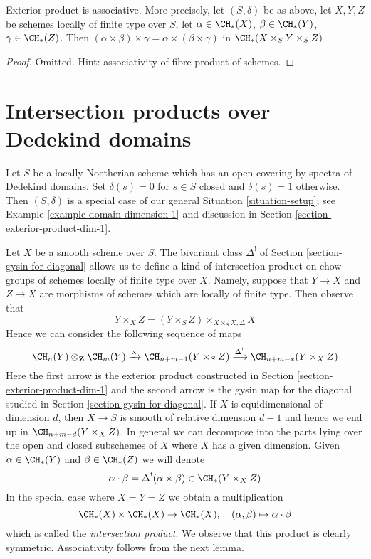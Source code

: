 \begin{lemma}
\label{lemma-exterior-product-associative-dim-1}
Exterior product is associative. More precisely, let $(S, \delta)$ be
as above, let $X, Y, Z$ be schemes locally of finite type over $S$, let
$\alpha \in \CH_*(X)$, $\beta \in \CH_*(Y)$, $\gamma \in \CH_*(Z)$.
Then $(\alpha \times \beta) \times \gamma =
\alpha \times (\beta \times \gamma)$ in $\CH_*(X \times_S Y \times_S Z)$.
\end{lemma}

\begin{proof}
Omitted. Hint: associativity of fibre product of schemes.
\end{proof}















\section{Intersection products over Dedekind domains}
\label{section-intersection-product-dim-1}

\noindent
Let $S$ be a locally Noetherian scheme which has an open covering
by spectra of Dedekind domains. Set $\delta(s) = 0$ for $s \in S$ closed
and $\delta(s) = 1$ otherwise. Then $(S, \delta)$ is a special case of our
general Situation \ref{situation-setup}; see
Example \ref{example-domain-dimension-1} and discussion in
Section \ref{section-exterior-product-dim-1}.

\medskip\noindent
Let $X$ be a smooth scheme over $S$. The bivariant class $\Delta^!$
of Section \ref{section-gysin-for-diagonal} allows us to define a kind of
intersection product on chow groups of schemes locally of finite type over $X$.
Namely, suppose that $Y \to X$ and $Z \to X$ are morphisms of schemes
which are locally of finite type. Then observe that
$$
Y \times_X Z =  (Y \times_S Z) \times_{X \times_S X, \Delta} X
$$
Hence we can consider the following sequence of maps
$$
\CH_n(Y) \otimes_\mathbf{Z} \CH_m(Y)
\xrightarrow{\times}
\CH_{n + m - 1}(Y \times_S Z)
\xrightarrow{\Delta^!}
\CH_{n + m - *}(Y \times_X Z)
$$
Here the first arrow is the exterior product constructed in
Section \ref{section-exterior-product-dim-1} and the second arrow
is the gysin map for the diagonal studied in
Section \ref{section-gysin-for-diagonal}. If $X$ is equidimensional
of dimension $d$, then $X \to S$ is smooth of relative dimension $d - 1$
and hence we end up in $\CH_{n + m - d}(Y \times_X Z)$.
In general we can decompose into the parts lying over the open
and closed subschemes of $X$ where $X$ has a given dimension.
Given $\alpha \in \CH_*(Y)$ and $\beta \in \CH_*(Z)$ we will denote
$$
\alpha \cdot \beta = \Delta^!(\alpha \times \beta)
\in \CH_*(Y \times_X Z)
$$
In the special case where $X = Y = Z$ we obtain a multiplication
$$
\CH_*(X) \times \CH_*(X) \to \CH_*(X),\quad
(\alpha, \beta) \mapsto \alpha \cdot \beta
$$
which is called the {\it intersection product}. We observe that
this product is clearly symmetric. Associativity follows from
the next lemma.


